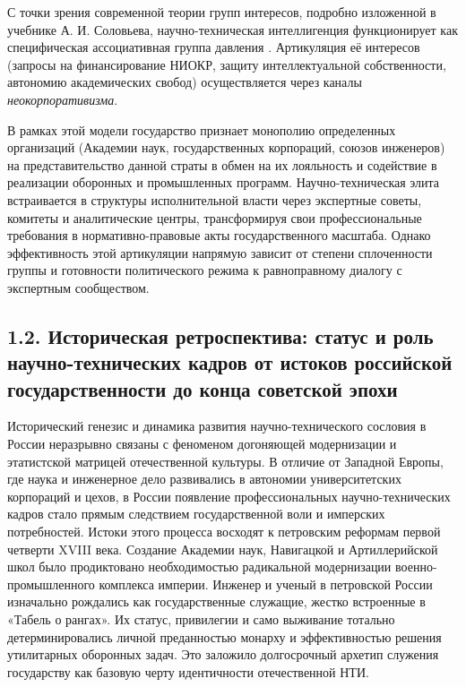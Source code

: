 С точки зрения современной теории групп интересов, подробно изложенной в учебнике А. И. Соловьева, научно-техническая интеллигенция функционирует как специфическая ассоциативная группа давления \cite{Solovyev}. Артикуляция её интересов (запросы на финансирование НИОКР, защиту интеллектуальной собственности, автономию академических свобод) осуществляется через каналы \textit{неокорпоративизма}. 

В рамках этой модели государство признает монополию определенных организаций (Академии наук, государственных корпораций, союзов инженеров) на представительство данной страты в обмен на их лояльность и содействие в реализации оборонных и промышленных программ. Научно-техническая элита встраивается в структуры исполнительной власти через экспертные советы, комитеты и аналитические центры, трансформируя свои профессиональные требования в нормативно-правовые акты государственного масштаба. Однако эффективность этой артикуляции напрямую зависит от степени сплоченности группы и готовности политического режима к равноправному диалогу с экспертным сообществом.

\subsection{1.2. Историческая ретроспектива: статус и роль научно-технических кадров от истоков российской государственности до конца советской эпохи}

Исторический генезис и динамика развития научно-технического сословия в России неразрывно связаны с феноменом догоняющей модернизации и этатистской матрицей отечественной культуры. В отличие от Западной Европы, где наука и инженерное дело развивались в автономии университетских корпораций и цехов, в России появление профессиональных научно-технических кадров стало прямым следствием государственной воли и имперских потребностей. Истоки этого процесса восходят к петровским реформам первой четверти XVIII века. Создание Академии наук, Навигацкой и Артиллерийской школ было продиктовано необходимостью радикальной модернизации военно-промышленного комплекса империи. Инженер и ученый в петровской России изначально рождались как государственные служащие, жестко встроенные в «Табель о рангах». Их статус, привилегии и само выживание тотально детерминировались личной преданностью монарху и эффективностью решения утилитарных оборонных задач. Это заложило долгосрочный архетип служения государству как базовую черту идентичности отечественной НТИ.

